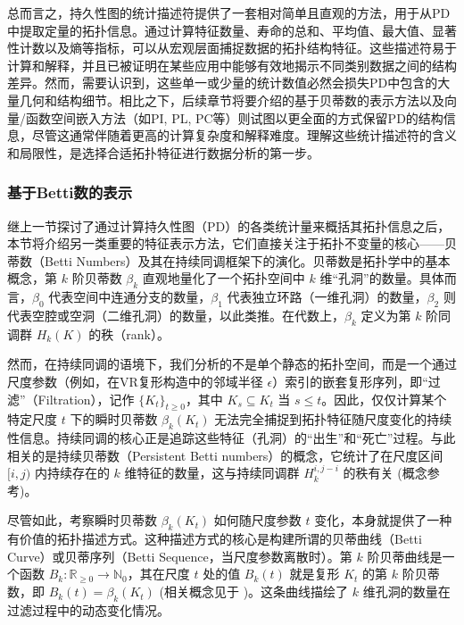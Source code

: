总而言之，持久性图的统计描述符提供了一套相对简单且直观的方法，用于从PD中提取定量的拓扑信息。通过计算特征数量、寿命的总和、平均值、最大值、显著性计数以及熵等指标，可以从宏观层面捕捉数据的拓扑结构特征。这些描述符易于计算和解释，并且已被证明在某些应用中能够有效地揭示不同类别数据之间的结构差异。然而，需要认识到，这些单一或少量的统计数值必然会损失PD中包含的大量几何和结构细节。相比之下，后续章节将要介绍的基于贝蒂数的表示方法以及向量/函数空间嵌入方法（如PI, PL, PC等）则试图以更全面的方式保留PD的结构信息，尽管这通常伴随着更高的计算复杂度和解释难度。理解这些统计描述符的含义和局限性，是选择合适拓扑特征进行数据分析的第一步。

\subsubsection{基于Betti数的表示}
\label{sec:betti_features}
继上一节探讨了通过计算持久性图（PD）的各类统计量来概括其拓扑信息之后，本节将介绍另一类重要的特征表示方法，它们直接关注于拓扑不变量的核心——贝蒂数（Betti Numbers）及其在持续同调框架下的演化。贝蒂数是拓扑学中的基本概念，第 $k$ 阶贝蒂数 $\beta_k$ 直观地量化了一个拓扑空间中 $k$ 维“孔洞”的数量。具体而言，$\beta_0$ 代表空间中连通分支的数量，$\beta_1$ 代表独立环路（一维孔洞）的数量，$\beta_2$ 则代表空腔或空洞（二维孔洞）的数量，以此类推。在代数上，$\beta_k$ 定义为第 $k$ 阶同调群 $H_k(K)$ 的秩（rank）。

然而，在持续同调的语境下，我们分析的不是单个静态的拓扑空间，而是一个通过尺度参数（例如，在VR复形构造中的邻域半径 $\epsilon$）索引的嵌套复形序列，即“过滤”（Filtration），记作 $\{K_t\}_{t \ge 0}$，其中 $K_s \subseteq K_t$ 当 $s \le t$。因此，仅仅计算某个特定尺度 $t$ 下的瞬时贝蒂数 $\beta_k(K_t)$ 无法完全捕捉到拓扑特征随尺度变化的持续性信息。持续同调的核心正是追踪这些特征（孔洞）的“出生”和“死亡”过程。与此相关的是持续贝蒂数（Persistent Betti numbers）的概念，它统计了在尺度区间 $[i, j)$ 内持续存在的 $k$ 维特征的数量，这与持续同调群 $H_k^{i, j-i}$ 的秩有关 (概念参考)。

尽管如此，考察瞬时贝蒂数 $\beta_k(K_t)$ 如何随尺度参数 $t$ 变化，本身就提供了一种有价值的拓扑描述方式。这种描述方式的核心是构建所谓的贝蒂曲线（Betti Curve）或贝蒂序列（Betti Sequence，当尺度参数离散时）。第 $k$ 阶贝蒂曲线是一个函数 $B_k: \mathbb{R}_{\ge 0} \rightarrow \mathbb{N}_0$，其在尺度 $t$ 处的值 $B_k(t)$ 就是复形 $K_t$ 的第 $k$ 阶贝蒂数，即 $B_k(t) = \beta_k(K_t)$ (相关概念见于 )。这条曲线描绘了 $k$ 维孔洞的数量在过滤过程中的动态变化情况。

